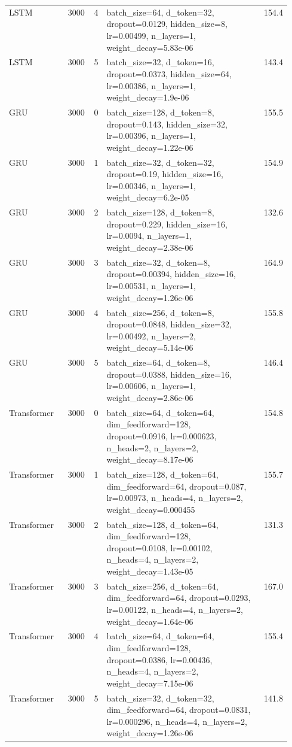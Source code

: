 \begin{longtable}{lrrp{0.55\linewidth}r}
LSTM & 3000 & 4 & batch\_size=64, d\_token=32, dropout=0.0129, hidden\_size=8, lr=0.00499, n\_layers=1, weight\_decay=5.83e-06 & 154.4 \\
LSTM & 3000 & 5 & batch\_size=32, d\_token=16, dropout=0.0373, hidden\_size=64, lr=0.00386, n\_layers=1, weight\_decay=1.9e-06 & 143.4 \\
GRU & 3000 & 0 & batch\_size=128, d\_token=8, dropout=0.143, hidden\_size=32, lr=0.00396, n\_layers=1, weight\_decay=1.22e-06 & 155.5 \\
GRU & 3000 & 1 & batch\_size=32, d\_token=32, dropout=0.19, hidden\_size=16, lr=0.00346, n\_layers=1, weight\_decay=6.2e-05 & 154.9 \\
GRU & 3000 & 2 & batch\_size=128, d\_token=8, dropout=0.229, hidden\_size=16, lr=0.0094, n\_layers=1, weight\_decay=2.38e-06 & 132.6 \\
GRU & 3000 & 3 & batch\_size=32, d\_token=8, dropout=0.00394, hidden\_size=16, lr=0.00531, n\_layers=1, weight\_decay=1.26e-06 & 164.9 \\
GRU & 3000 & 4 & batch\_size=256, d\_token=8, dropout=0.0848, hidden\_size=32, lr=0.00492, n\_layers=2, weight\_decay=5.14e-06 & 155.8 \\
GRU & 3000 & 5 & batch\_size=64, d\_token=8, dropout=0.0388, hidden\_size=16, lr=0.00606, n\_layers=1, weight\_decay=2.86e-06 & 146.4 \\
Transformer & 3000 & 0 & batch\_size=64, d\_token=64, dim\_feedforward=128, dropout=0.0916, lr=0.000623, n\_heads=2, n\_layers=2, weight\_decay=8.17e-06 & 154.8 \\
Transformer & 3000 & 1 & batch\_size=128, d\_token=64, dim\_feedforward=64, dropout=0.087, lr=0.00973, n\_heads=4, n\_layers=2, weight\_decay=0.000455 & 155.7 \\
Transformer & 3000 & 2 & batch\_size=128, d\_token=64, dim\_feedforward=128, dropout=0.0108, lr=0.00102, n\_heads=4, n\_layers=2, weight\_decay=1.43e-05 & 131.3 \\
Transformer & 3000 & 3 & batch\_size=256, d\_token=64, dim\_feedforward=64, dropout=0.0293, lr=0.00122, n\_heads=4, n\_layers=2, weight\_decay=1.64e-06 & 167.0 \\
Transformer & 3000 & 4 & batch\_size=64, d\_token=64, dim\_feedforward=128, dropout=0.0386, lr=0.00436, n\_heads=4, n\_layers=2, weight\_decay=7.15e-06 & 155.4 \\
Transformer & 3000 & 5 & batch\_size=32, d\_token=32, dim\_feedforward=64, dropout=0.0831, lr=0.000296, n\_heads=4, n\_layers=2, weight\_decay=1.26e-06 & 141.8 \\
\end{longtable}
